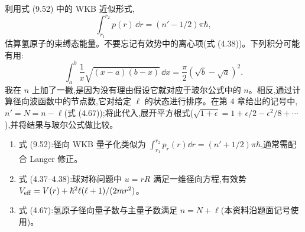 \begin{question}
利用式 (9.52) 中的 WKB 近似形式,
\[
\int_{r_1}^{r_2}p(r)\,\dd r=(n'-1/2)\pi\hbar,
\]
估算氢原子的束缚态能量。不要忘记有效势中的离心项(式 (4.38))。下列积分可能有用:
\[
\int_a^b\frac{1}{x}\sqrt{(x-a)(b-x)}\,\dd x=\frac{\pi}{2}(\sqrt b-\sqrt a)^2.
\]
我在 $n$ 上加了一撇,是因为没有理由假设它就对应于玻尔公式中的 $n$。相反,通过计算径向波函数中的节点数,它对给定 $\ell$ 的状态进行排序。在第 4 章给出的记号中,$n'=N=n-\ell$(式 (4.67));将此代入,展开平方根式($\sqrt{1+\epsilon}=1+\epsilon/2-\epsilon^2/8+\cdots$),并将结果与玻尔公式做比较。

\par\smallskip
{}
\begin{enumerate}[leftmargin=2.2em,itemsep=0.12em,topsep=0.12em,parsep=0pt]
\item 式 (9.52):径向 WKB 量子化类似为 $\int_{r_1}^{r_2}p_r(r)\dd r=(n'+1/2)\pi\hbar$,通常需配合 Langer 修正。
\item 式 (4.37--4.38):球对称问题中 $u=rR$ 满足一维径向方程,有效势 $V_{\rm eff}=V(r)+\hbar^2\ell(\ell+1)/(2mr^2)$。
\item 式 (4.67):氢原子径向量子数与主量子数满足 $n=N+\ell$(本资料沿题面记号使用)。
\end{enumerate}

\end{question}
